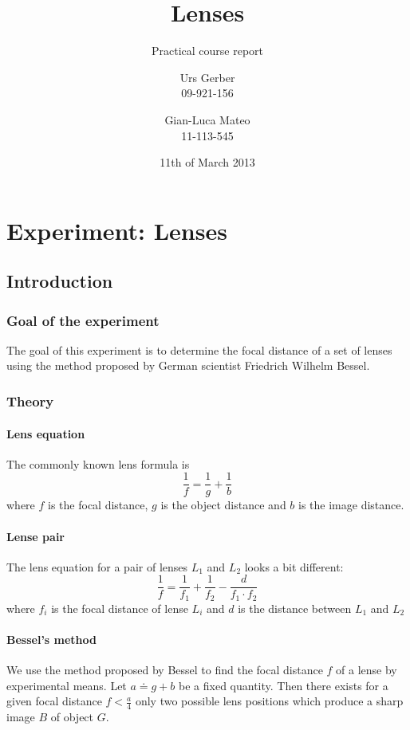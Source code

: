 \documentclass{scrreprt}
\author{Urs Gerber\\09-921-156 \and Gian-Luca Mateo\\11-113-545}
\date{11th of March 2013}
\title{Lenses}
\subtitle{Practical course report}
\begin{document}
\maketitle

\tableofcontents
\newpage

\chapter{Experiment: Lenses}

\section{Introduction}

\subsection{Goal of the experiment}
The goal of this experiment is to determine the focal distance of a set of lenses using the method proposed by German scientist Friedrich Wilhelm Bessel.

\subsection{Theory}

\subsubsection{Lens equation}
The commonly known lens formula is
\begin{equation}
\frac{1}{f} = \frac{1}{g} + \frac{1}{b}
\end{equation}
where $f$ is the focal distance, $g$ is the object distance and $b$ is the image distance.

\subsubsection{Lense pair}
The lens equation for a pair of lenses $L_1$ and $L_2$ looks a bit different:
\begin{equation}
\frac{1}{f}= \frac{1}{f_1} + \frac{1}{f_2} - \frac{d}{f_1 \cdot f_2}
\end{equation}
where $f_i$ is the focal distance of lense $L_i$ and $d$ is the distance between $L_1$ and $L_2$

\subsubsection{Bessel's method}
We use the method proposed by Bessel to find the focal distance $f$ of a lense by experimental means. Let $a \doteq g + b$ be a fixed quantity. Then there exists for a given focal distance $f < \frac{a}{4}$ only two possible lens positions which produce a sharp image $B$ of object $G$. 
\end{document}
